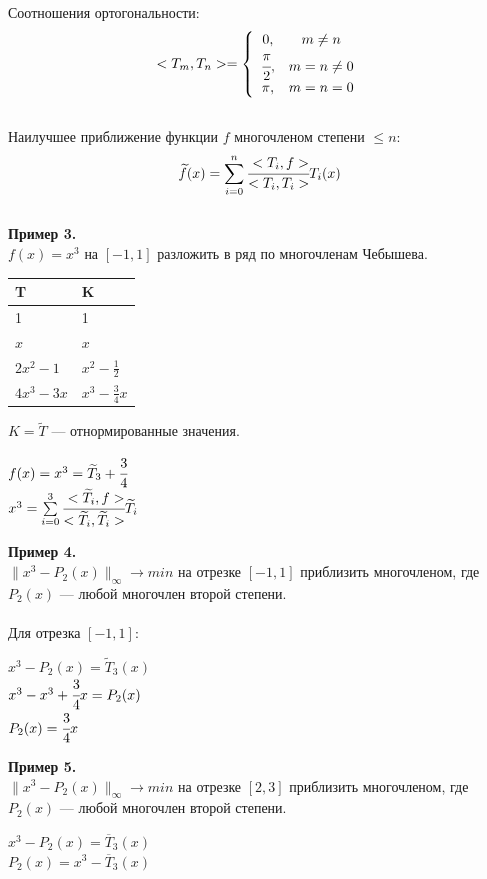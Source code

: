 \documentclass[12pt]{article}
\theoremstyle{definition}
\numberwithin{equation}{section}
\begin{document}
	Соотношения ортогональности: $$<T_m, T_n>=
	\left\{  
	\begin{array}{ccl}  
	0,& m\neq n\\
	\cfrac{\pi}{2},& m=n\neq 0\\
	\pi,& m=n=0\\  
	\end{array}   
	\right.  
	$$
	\\
	Наилучшее приближение функции $f$ многочленом степени $\leqslant n:$ $$\widetilde f(x)=\sum\limits_{i=0}^n\cfrac{<T_i, f>}{<T_i, T_i>}T_i(x)$$\\
	\textbf{Пример 3.}\\
	$f(x)=x^3$ на $[-1, 1]$ разложить в ряд по многочленам Чебышева.
	\begin{center}
		\begin{tabular}{|l|l|}
			\hline
			T & K \\ \hline
			1 & 1 \\ \hline
			$x$ & $x$ \\ \hline
			$2x^2-1$ & $x^2-\frac{1}{2}$ \\ \hline
			$4x^3-3x$ & $x^3-\frac{3}{4}x$\\ \hline
		\end{tabular}
	\end{center}
	$K=\widetilde T$ --- отнормированные значения.\begin{center}
		$f(x)=x^3=\widetilde T_3+\cfrac{3}{4}\title{T_1}$\\
		$x^3=\sum\limits_{i=0}^3\cfrac{<\widetilde T_i, f>}{<\widetilde T_i, \widetilde T_i>}\widetilde T_i$
	\end{center}
	\textbf{Пример 4.}\\
	$\parallel x^3-P_2(x) \parallel_\infty \to min$ на отрезке $[-1, 1]$ приблизить многочленом, где $P_2(x)$ --- любой многочлен второй степени.\\
	\\
	Для отрезка $[-1, 1]$: \begin{center}
		$x^3-P_2(x)=\widetilde T_3(x)$\\
		$x^3-x^3+\cfrac{3}{4}x=P_2(x)$\\
		$P_2(x)=\cfrac{3}{4}x$
	\end{center}
	\textbf{Пример 5.}\\
	$\parallel x^3-P_2(x) \parallel_\infty \to min$ на отрезке $[2, 3]$ приблизить многочленом, где $P_2(x)$ --- любой многочлен второй степени.\\
	\begin{center}
		$x^3-P_2(x)=\overline T_3(x)$\\
		$P_2(x)=x^3-\overline T_3(x)$\\
	\end{center}
\end{document}
